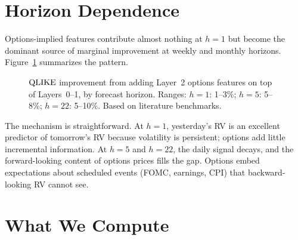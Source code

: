 \section{Horizon Dependence}
\label{sec:horizon-dependence}

Options-implied features contribute almost nothing at $h = 1$ but become the dominant source of marginal improvement at weekly and monthly horizons.
Figure~\ref{fig:options-horizon} summarizes the pattern.

\begin{figure}[htbp]
\centering
{}
\caption{$\operatorname{QLIKE}$ improvement from adding Layer~2 options features on top of Layers~0--1, by forecast horizon. Ranges: $h{=}1$: 1--3\%; $h{=}5$: 5--8\%; $h{=}22$: 5--10\%. Based on literature benchmarks.}
\label{fig:options-horizon}
\end{figure}

The mechanism is straightforward.
At $h = 1$, yesterday's RV is an excellent predictor of tomorrow's RV because volatility is persistent; options add little incremental information.
At $h = 5$ and $h = 22$, the daily signal decays, and the forward-looking content of options prices fills the gap.
Options embed expectations about scheduled events (FOMC, earnings, CPI) that backward-looking RV cannot see.


\section{What We Compute}
\label{sec:what-we-compute}

